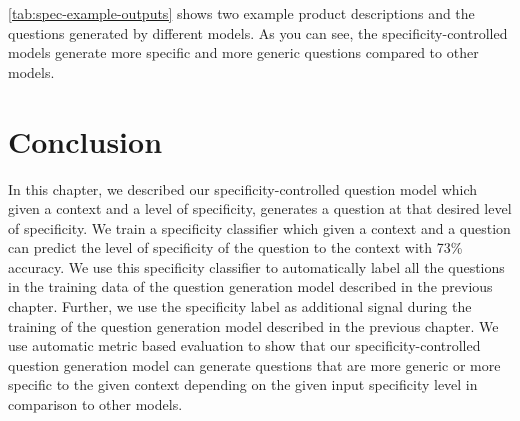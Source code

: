 \documentclass[11pt,a4paper]{article}
\begin{document}
\autoref{tab:spec-example-outputs} shows two example product descriptions and the questions generated by different models. 
As you can see, the specificity-controlled models generate more specific and more generic questions compared to other models. 


\section{Conclusion}

In this chapter, we described our specificity-controlled question model which given a context and a level of specificity, generates a question at that desired level of specificity.
We train a specificity classifier which given a context and a question can predict the level of specificity of the question to the context with 73\% accuracy.
We use this specificity classifier to automatically label all the questions in the training data of the question generation model described in the previous chapter. 
Further, we use the specificity label as additional signal during the training of the question generation model described in the previous chapter.
We use automatic metric based evaluation to show that our specificity-controlled question generation model can generate questions that are more generic or more specific to the given context depending on the given input specificity level in comparison to other models. 
\end{document}
